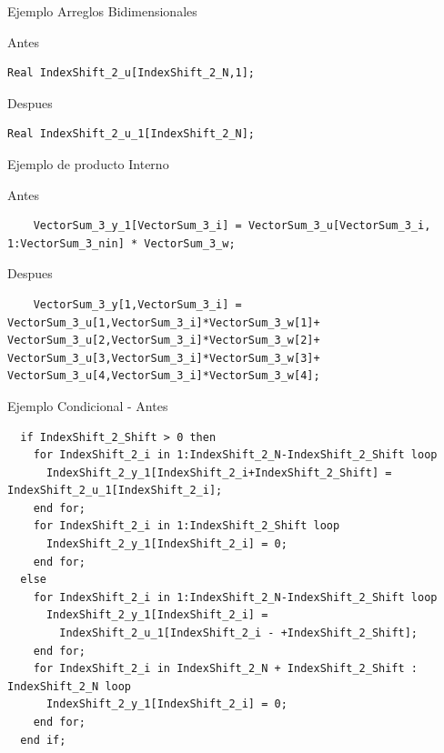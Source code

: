 \documentclass[10pt,handout]{beamer}
\begin{document}
\begin{frame}[fragile]{Ejemplo Arreglos Bidimensionales}
\begin{block}{Antes}
\begin{verbatim}
Real IndexShift_2_u[IndexShift_2_N,1];
\end{verbatim}
\end{block}

\begin{block}{Despues}
\begin{verbatim}
Real IndexShift_2_u_1[IndexShift_2_N];
\end{verbatim}
\end{block}
\end{frame}



\begin{frame}[fragile]{Ejemplo de producto Interno}
\begin{block}{Antes}
\begin{verbatim}
    VectorSum_3_y_1[VectorSum_3_i] = VectorSum_3_u[VectorSum_3_i, 1:VectorSum_3_nin] * VectorSum_3_w;
\end{verbatim}
\end{block}
	
\begin{block}{Despues}
\begin{verbatim}
    VectorSum_3_y[1,VectorSum_3_i] = VectorSum_3_u[1,VectorSum_3_i]*VectorSum_3_w[1]+ VectorSum_3_u[2,VectorSum_3_i]*VectorSum_3_w[2]+ VectorSum_3_u[3,VectorSum_3_i]*VectorSum_3_w[3]+ VectorSum_3_u[4,VectorSum_3_i]*VectorSum_3_w[4];
\end{verbatim}
\end{block}
\end{frame}

\begin{frame}[fragile]{Ejemplo Condicional - Antes}
\begin{verbatim}
  if IndexShift_2_Shift > 0 then
    for IndexShift_2_i in 1:IndexShift_2_N-IndexShift_2_Shift loop
      IndexShift_2_y_1[IndexShift_2_i+IndexShift_2_Shift] = IndexShift_2_u_1[IndexShift_2_i];
    end for;
    for IndexShift_2_i in 1:IndexShift_2_Shift loop
      IndexShift_2_y_1[IndexShift_2_i] = 0;
    end for;
  else
    for IndexShift_2_i in 1:IndexShift_2_N-IndexShift_2_Shift loop
      IndexShift_2_y_1[IndexShift_2_i] = 
		IndexShift_2_u_1[IndexShift_2_i - +IndexShift_2_Shift];
    end for;
    for IndexShift_2_i in IndexShift_2_N + IndexShift_2_Shift : IndexShift_2_N loop
      IndexShift_2_y_1[IndexShift_2_i] = 0;
    end for;
  end if;
\end{verbatim}
\end{frame}
\end{document}
